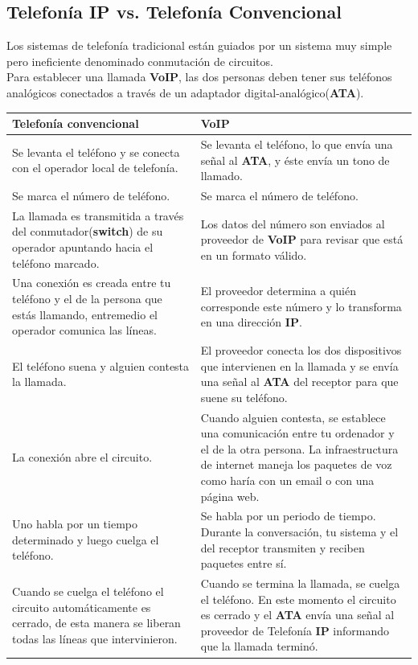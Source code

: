 \documentclass[a4paper, 11pt]{article} %
\begin{document}
	\subsection{Telefonía IP vs. Telefonía Convencional}
		Los sistemas de telefonía tradicional están guiados por un sistema muy simple pero ineficiente denominado conmutación de circuitos.\\
		Para establecer una llamada \textbf{VoIP}, las dos personas deben tener sus teléfonos analógicos conectados a través de un adaptador digital-analógico(\textbf{ATA}).\\
		\begin{tabular}{|p{6cm}|p{6cm}|}
			\hline
			\textbf{Telefonía convencional} & \textbf{VoIP} \\
			\hline \hline
			Se levanta el teléfono y se conecta con el operador local de telefonía. & Se levanta el teléfono, lo que envía una señal al \textbf{ATA}, y éste envía un tono de llamado. \\
			\hline
			Se marca el número de teléfono. & Se marca el número de teléfono. \\
			\hline
			La llamada es transmitida a través del conmutador(\textbf{switch}) de su operador apuntando hacia el teléfono marcado. & Los datos del número son enviados al proveedor de \textbf{VoIP} para revisar que está en un formato válido. \\
			\hline
			Una conexión es creada entre tu teléfono y el de la persona que estás llamando, entremedio el operador comunica las líneas. & El proveedor determina a quién corresponde este número y lo transforma en una dirección \textbf{IP}. \\
			\hline
			El teléfono suena y alguien contesta la llamada. & El proveedor conecta los dos dispositivos que intervienen en la llamada y se envía una señal al \textbf{ATA} del receptor para que suene su teléfono. \\
			\hline
			La conexión abre el circuito. & Cuando alguien contesta, se establece una comunicación entre tu ordenador y el de la otra persona. La infraestructura de internet maneja los paquetes de voz como haría con un email o con una página web. \\
			\hline
			Uno habla por un tiempo determinado y luego cuelga el teléfono. & Se habla por un periodo de tiempo. Durante la conversación, tu sistema y el del receptor transmiten y reciben paquetes entre sí. \\
			\hline
			Cuando se cuelga el teléfono el circuito automáticamente es cerrado, de esta manera se liberan todas las líneas que intervinieron. & Cuando se termina la llamada, se cuelga el teléfono. En este momento el circuito es cerrado y el \textbf{ATA} envía una señal al proveedor de Telefonía \textbf{IP} informando que la llamada terminó. \\
			\hline
		\end{tabular}
		\label{tabla:vs}
		
\end{document}
